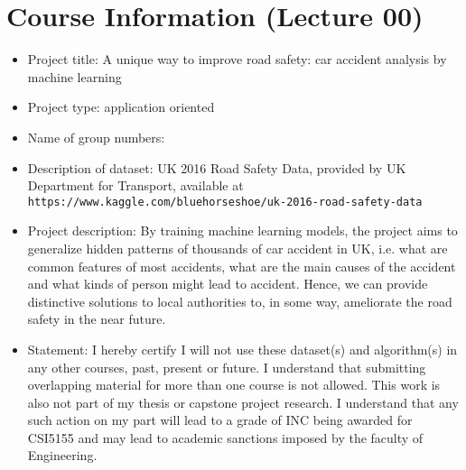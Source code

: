 \documentclass{article}
\begin{document}
\section{Course Information (Lecture 00)}
\begin{itemize}
\item Project title: A unique way to improve road safety: car accident analysis by machine learning
\item Project type: application oriented
\item Name of group numbers:
\item Description of dataset: UK 2016 Road Safety Data, provided by UK Department for Transport, available at
	\newline \texttt{https://www.kaggle.com/bluehorseshoe/uk-2016-road-safety-data}
\item Project description: By training machine learning models, the project aims to generalize hidden patterns of thousands of car accident in UK, i.e. what are common features of most accidents, what are the main causes of the accident and what kinds of person might lead to accident. Hence, we can provide distinctive solutions to local authorities to, in some way, ameliorate the road safety in the near future.
\item Statement: I hereby certify I will not use
these dataset(s) and algorithm(s) in any other courses, past, present or future. I understand that
submitting overlapping material for more than one course is not allowed. This work is also not
part of my thesis or capstone project research. I understand that any such action on my part will
lead to a grade of INC being awarded for CSI5155 and may lead to academic sanctions imposed
by the faculty of Engineering.
\end{itemize}
\end{document}
